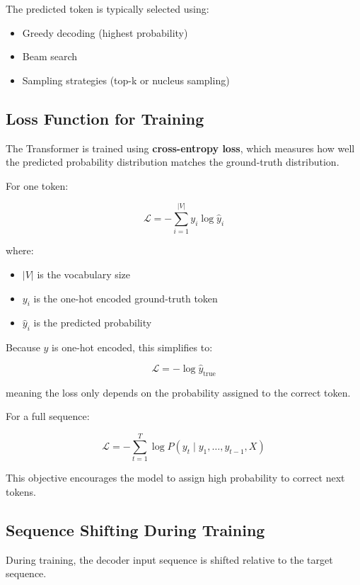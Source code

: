 \documentclass[11pt]{article}
\begin{document}
The predicted token is typically selected using:

\begin{itemize}

\item Greedy decoding (highest probability)
\item Beam search
\item Sampling strategies (top-k or nucleus sampling)

\end{itemize}

\subsection{Loss Function for Training}

The Transformer is trained using \textbf{cross-entropy loss}, which measures how well the predicted probability distribution matches the ground-truth distribution.

For one token:

\[
\mathcal{L}
=
-\sum_{i=1}^{|V|}
y_i \log \hat{y}_i
\]

where:

\begin{itemize}[nosep]

\item $|V|$ is the vocabulary size
\item $y_i$ is the one-hot encoded ground-truth token
\item $\hat{y}_i$ is the predicted probability

\end{itemize}

Because $y$ is one-hot encoded, this simplifies to:

\[
\mathcal{L}
=
- \log \hat{y}_{\text{true}}
\]

meaning the loss only depends on the probability assigned to the correct token.

For a full sequence:

\[
\mathcal{L}
=
-\sum_{t=1}^{T}
\log
P(y_t \mid y_1,\ldots,y_{t-1},X)
\]

This objective encourages the model to assign high probability to correct next tokens.

\subsection{Sequence Shifting During Training}

During training, the decoder input sequence is shifted relative to the target sequence.
\end{document}
